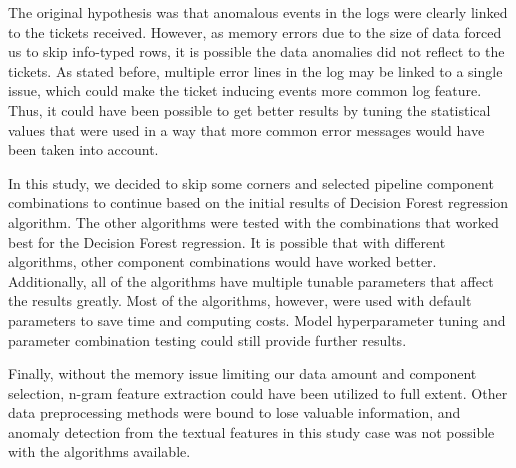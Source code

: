 The original hypothesis was
that anomalous events in the logs
were clearly linked to the tickets received.
However,
as memory errors due to the size of data forced us to skip info-typed rows,
it is possible the data anomalies did not reflect to the tickets.
As stated before,
multiple error lines in the log may be linked to a single issue,
which could make the ticket inducing events
more common log feature.
Thus,
it could have been possible to get better results
by tuning the statistical values that were used
in a way that more common error messages would have been taken into account.

In this study,
we decided to skip some corners
and selected pipeline component combinations to continue
based on the initial results of Decision Forest regression algorithm.
The other algorithms were tested with
the combinations that worked best for the Decision Forest regression.
It is possible
that with different algorithms,
other component combinations would have worked better.
Additionally,
all of the algorithms have multiple tunable parameters
that affect the results greatly.
Most of the algorithms, however,
were used with default parameters
to save time and computing costs.
Model hyperparameter tuning and parameter combination testing
could still provide further results.

Finally,
without the memory issue limiting our data amount and component selection,
n-gram feature extraction could have been utilized to full extent.
Other data preprocessing methods were bound to lose valuable information,
and anomaly detection from the textual features in this study case
was not possible with the algorithms available.


\clearpage